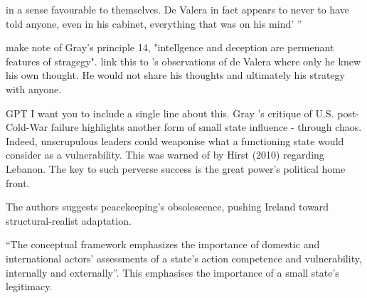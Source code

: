 in a sense favourable to themselves. De Valera in fact appears to never to have told anyone, even in his cabinet, everything that was on his mind' ''

 \parencite{GRAY_2018} make note of Gray's principle 14, "intellgence and deception are permenant features of stragegy". link this to \parencite{FANNING_2015}'s observations of de Valera where only he knew his own thought. He would not share his thoughts and ultimately his strategy with anyone.                                                                                                                                    


\parencite{GRAY_2005} GPT I want you to include a single line about this. Gray \nocite{GRAY_2005}'s critique of U.S. post-Cold-War failure highlights another form of small state influence - through chaos. Indeed, unscrupulous leaders could weaponise what a functioning state would consider as a vulnerability. This was warned of by Hirst (2010) \nocite{HIRST_2010} regarding Lebanon. The key to such perverse success is the great power's political home front.  

\textcite{DUMAN_2025} The authors suggests peacekeeping’s obsolescence, pushing Ireland toward structural-realist adaptation.
 
\parencite{THORHALLSSON_2006} ``The conceptual framework emphasizes the
importance of domestic and international actors’ assessments of a state’s
action competence and vulnerability, internally and externally''. This emphasises the importance of a small state's legitimacy. 

